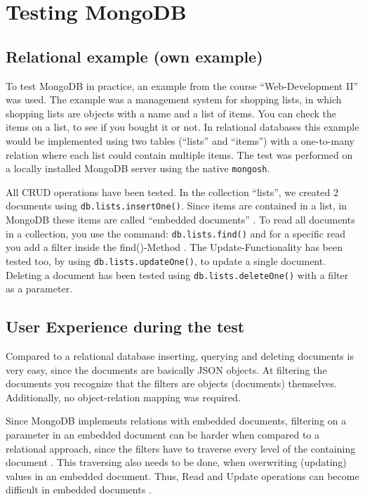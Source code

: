 
\section{Testing MongoDB}

\subsection{Relational example (own example)}
To test MongoDB in practice, an example from the course \enquote{Web-Development II} was used. 
The example was a management system for shopping lists, in which shopping lists are objects with a name and a list of items.
You can check the items on a list, to see if you bought it or not.
In relational databases this example would be implemented using two tables (\enquote{lists} and \enquote{items}) with a one-to-many
relation where each list could contain multiple items.
The test was performed on a locally installed MongoDB server using the native \texttt{mongosh}.

All CRUD operations have been tested.
In the collection \enquote{lists}, we created 2 documents using \texttt{db.lists.insertOne()}. 
Since items are contained in a list, in MongoDB these items are called \enquote{embedded documents} \parencite[p. 6]{Membrey2014}. 
To read all documents in a collection, you use the command: \texttt{db.lists.find()} and for a specific read you add a filter inside the {find()}-Method \parencite{Mongo-read}. 
The Update-Functionality has been tested too, by using \texttt{db.lists.updateOne()}, to update a single document. 
Deleting a document has been tested using \texttt{db.lists.deleteOne()} with a filter as a parameter.


\subsection{User Experience during the test}
Compared to a relational database inserting, querying and deleting documents is very easy, since the documents are basically JSON objects.
At filtering the documents you recognize that the filters are objects (documents) themselves. Additionally, no object-relation mapping was required. 

Since MongoDB implements relations with embedded documents, filtering on a parameter in an embedded document can be harder when compared to a 
relational approach, since the filters have to traverse every level of the containing document \parencite{Mongo-Embedded-Query}. 
This traversing also needs to be done, when overwriting (updating) values in an embedded document. Thus, Read and Update operations can become 
difficult in embedded documents \parencite{Mongo-update}. 